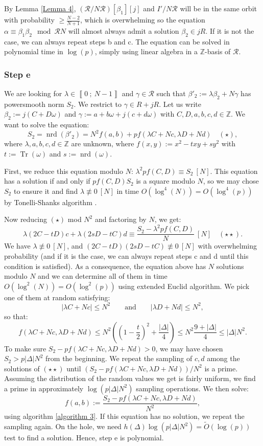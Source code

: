 \documentclass[a4paper,10pt]{report}
\theoremstyle{definition}
\theoremstyle{plain}
\theoremstyle{definition}
\newcommand{\Z}{\mathbb{Z}}
\newcommand{\m}[1]{\mathcal{#1}}
\renewcommand{\i}[2]{\left\llbracket #1~;~#2\right\rrbracket}
\renewcommand{\(}{\left(}
\renewcommand{\)}{\right)}
\DeclareMathOperator{\Tr}{Tr}
\DeclareMathOperator{\nrd}{nrd}
\begin{document}
By Lemma \ref{Lemma 4}, $(\m{R}/N\m{R})[\beta_1][j]$ and $I'/N\m{R}$ will be in the same orbit with probability $\geq \frac{N-2}{N+1}$, which is overwhelming so the equation $\alpha\equiv\beta_1\beta_2 \mod \m{R}N$ will almost always admit a solution $\beta_2\in jR$. If it is not the case, we can always repeat steps b and c. The equation can be solved in polynomial time in $\log(p)$, simply using linear algebra in a $\Z$-basis of $\m{R}$.

\subsubsection{Step e}

We are looking for $\lambda\in\i{0}{N-1}$ and $\gamma\in\m{R}$ such that $\beta'_2:=\lambda\beta_2+N\gamma$ has powersmooth norm $S_2$.  We restrict to $\gamma\in R+jR$. Let us write $\beta_2:=j(C+D\omega)$ and $\gamma:=a+b\omega+j(c+d\omega)$ with $C, D, a,b,c,d\in\Z$. We want to solve the equation:
\[S_2=\nrd(\beta'_2)=N^2f(a,b)+pf(\lambda C+Nc,\lambda D+Nd)\quad (\star),\]
where $\lambda,a,b,c,d\in\Z$ are unknown, where $f(x,y):=x^2-txy+sy^2$ with $t:=\Tr(\omega)$ and $s:=\nrd(\omega)$. 

First, we reduce this equation modulo $N$: $\lambda^2 p f(C,D)\equiv S_2 \ [N]$. This equation has a solution if and only if $p f(C,D) S_2$ is a square modulo $N$, so we may chose $S_2$ to ensure it and find $\lambda\not\equiv 0 \ [N]$ in time $O(\log^4(N))=O(\log^4(p))$ by Tonelli-Shanks algorithm \cite[algorithm 1.5.1]{Cohen1}.  

Now reducing $(\star)$ mod $N^2$ and factoring by $N$, we get:
\[\lambda(2C-tD)c+\lambda(2sD-tC)d\equiv \frac{S_2-\lambda^2 p f(C,D)}{N} \ [N]\quad (\star\star).\]
We have $\lambda\not\equiv 0 \ [N]$, and $(2C-tD)(2sD-tC)\not\equiv 0 \ [N]$ with overwhelming probability (and if it is the case, we can always repeat steps c and d until this condition is satisfied). As a consequence, the equation above has $N$ solutions modulo $N$ and we can determine all of them in time $O(\log^2(N))=O(\log^2(p))$ using extended Euclid algorithm.  We pick one of them at random satisfying:
\[|\lambda C+Nc|\leq N^2 \qquad \mbox{and} \qquad |\lambda D+Nd|\leq N^2,\]
so that:
\[f(\lambda C+Nc,\lambda D+Nd)\leq N^2\(\(1-\frac{t}{2}\)^2+\frac{|\Delta|}{4}\)\leq N^2\frac{9+|\Delta|}{4}\leq |\Delta|N^2.\]
To make sure $S_2-pf(\lambda C+Nc,\lambda D+Nd)>0$, we may have chosen $S_2>p|\Delta|N^2$ from the beginning. We repeat the sampling of $c,d$ among the solutions of $(\star\star)$ until $(S_2-pf(\lambda C+Nc,\lambda D+Nd))/N^2$ is a prime. Assuming the distribution of the random values we get is fairly uniform, we find a prime in approximately $\log(p|\Delta|N^2)$ sampling operations. We then solve:
\[f(a,b):=\frac{S_2-pf(\lambda C+Nc,\lambda D+Nd)}{N^2},\]
using algorithm \ref{algorithm 3}. If this equation has no solution, we repeat the sampling again. On the hole, we need $h(\Delta)\log(p|\Delta|N^2)=\tilde{O}(\log(p))$ test to find a solution. Hence, step e is polynomial.
\end{document}
